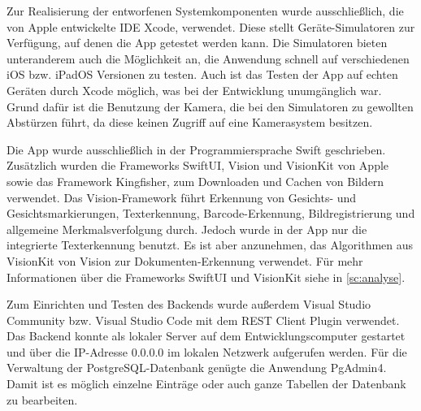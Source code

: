 \documentclass[notables, nomenclature, oneside, 150]{HSMW-Thesis}
\begin{document}
		Zur Realisierung der entworfenen Systemkomponenten wurde ausschließlich, die von Apple entwickelte IDE Xcode, verwendet. Diese stellt Geräte-Simulatoren zur Verfügung, auf denen die App getestet werden kann. Die Simulatoren bieten unteranderem auch die Möglichkeit an, die Anwendung schnell auf verschiedenen iOS bzw. iPadOS Versionen zu testen. Auch ist das Testen der App auf echten Geräten durch Xcode möglich, was bei der Entwicklung unumgänglich war. Grund dafür ist die Benutzung der Kamera, die bei den Simulatoren zu gewollten Abstürzen führt, da diese keinen Zugriff auf eine Kamerasystem besitzen.
		
		Die App wurde ausschließlich in der Programmiersprache Swift geschrieben. Zusätzlich wurden die Frameworks SwiftUI, Vision und VisionKit von Apple sowie das Framework Kingfisher, zum Downloaden und Cachen von Bildern verwendet. Das Vision-Framework führt Erkennung von Gesichts- und Gesichtsmarkierungen, Texterkennung, Barcode-Erkennung, Bildregistrierung und allgemeine Merkmalsverfolgung durch. Jedoch wurde in der App nur die integrierte Texterkennung benutzt. Es ist aber anzunehmen, das Algorithmen aus VisionKit von Vision zur Dokumenten-Erkennung verwendet. Für mehr Informationen über die Frameworks SwiftUI und VisionKit siehe in \autoref{sc:analyse}.
		
		Zum Einrichten und Testen des Backends wurde außerdem Visual Studio Community bzw. Visual Studio Code mit dem REST Client Plugin verwendet. Das Backend konnte als lokaler Server auf dem Entwicklungscomputer gestartet und über die IP-Adresse 0.0.0.0 im lokalen Netzwerk aufgerufen werden. Für die Verwaltung der PostgreSQL-Datenbank genügte die Anwendung PgAdmin4. Damit ist es möglich einzelne Einträge oder auch ganze Tabellen der Datenbank zu bearbeiten.
		
\end{document}
